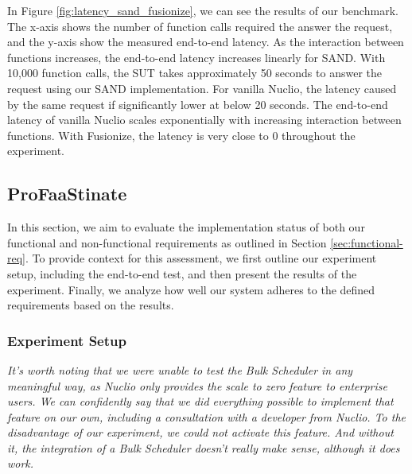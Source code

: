 In Figure \ref{fig:latency_sand_fusionize}, we can see the results of our
benchmark. The x-axis shows the number of function calls required the answer the
request, and the y-axis show the measured end-to-end latency. As the interaction
between functions increases, the end-to-end latency increases linearly for SAND.
With 10,000 function calls, the SUT takes approximately 50 seconds to answer the
request using our SAND implementation. For vanilla Nuclio, the latency caused by
the same request if significantly lower at below 20 seconds. The end-to-end
latency of vanilla Nuclio scales exponentially with increasing interaction
between functions. With Fusionize, the latency is very close to 0 throughout the
experiment.


\subsection{ProFaaStinate}
\label{sec:eval-profaastinate}
In this section, we aim to evaluate the implementation status of both our functional and non-functional requirements as outlined in Section \ref{sec:functional-req}. To provide context for this assessment, we first outline our experiment setup, including the end-to-end test, and then present the results of the experiment. Finally, we analyze how well our system adheres to the defined requirements based on the results.

\subsubsection{Experiment Setup}

\textit{
It's worth noting that we were unable to test the Bulk Scheduler in any meaningful way, as Nuclio only provides the scale to zero feature to enterprise users. We can confidently say that we did everything possible to implement that feature on our own, including a consultation with a developer from Nuclio. To the disadvantage of our experiment, we could not activate this feature. And without it, the integration of a Bulk Scheduler doesn't really make sense, although it does work.
}

